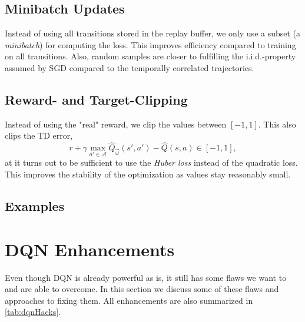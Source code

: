 		\subsection{Minibatch Updates}
			Instead of using all transitions stored in the replay buffer, we only use a subset (a \emph{minibatch}) for computing the loss. This improves efficiency compared to training on all transitions. Also, random samples are closer to fulfilling the i.i.d.-property assumed by \ac{SGD} compared to the temporally correlated trajectories.

		\subsection{Reward- and Target-Clipping}
			Instead of using the "real" reward, we clip the values between \( [-1, 1] \). This also clips the \ac{TD} error,
			\begin{equation}
				r + \gamma \max_{a' \in \mathcal{A}} \hat{Q}_{\vec{\omega}}(s', a') - \hat{Q}(s, a) \in [-1, 1],
			\end{equation}
			at it turns out to be sufficient to use the \emph{Huber loss} instead of the quadratic loss. This improves the stability of the optimization as values stay reasonably small.

		\subsection{Examples}

	\section{\acs{DQN} Enhancements}
		Even though \ac{DQN} is already powerful as is, it still has some flaws we want to and are able to overcome. In this section we discuss some of these flaws and approaches to fixing them. All enhancements are also summarized in \autoref{tab:dqnHacks}.

